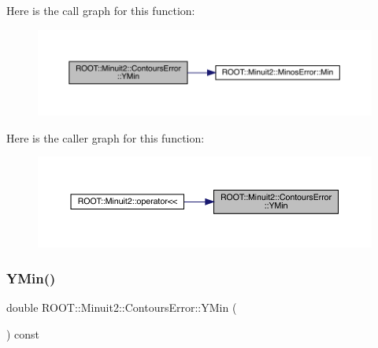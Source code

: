 Here is the call graph for this function\+:
\nopagebreak
\begin{figure}[H]
\begin{center}
\leavevmode
\includegraphics[width=350pt]{d3/de9/classROOT_1_1Minuit2_1_1ContoursError_ac2bd4c328fe62d04b2809d9e0730efe3_cgraph}
\end{center}
\end{figure}
Here is the caller graph for this function\+:
\nopagebreak
\begin{figure}[H]
\begin{center}
\leavevmode
\includegraphics[width=350pt]{d3/de9/classROOT_1_1Minuit2_1_1ContoursError_ac2bd4c328fe62d04b2809d9e0730efe3_icgraph}
\end{center}
\end{figure}
\mbox{\label{classROOT_1_1Minuit2_1_1ContoursError_ac2bd4c328fe62d04b2809d9e0730efe3}} 
\subsubsection{\texorpdfstring{YMin()}{YMin()}\hspace{0.1cm}{\footnotesize\ttfamily [2/3]}}
{\footnotesize\ttfamily double R\+O\+O\+T\+::\+Minuit2\+::\+Contours\+Error\+::\+Y\+Min (\begin{DoxyParamCaption}{ }\end{DoxyParamCaption}) const\hspace{0.3cm}{\ttfamily [inline]}}

